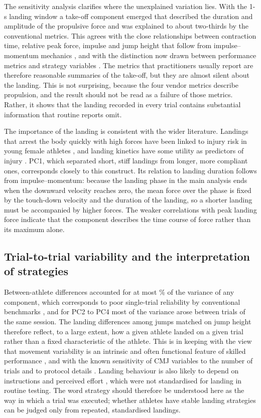 The sensitivity analysis clarifies where the unexplained variation lies. With the 1-s landing window a take-off component emerged that described the duration and amplitude of the propulsive force and was explained to about two-thirds by the conventional metrics. This agrees with the close relationships between contraction time, relative peak force, impulse and jump height that follow from impulse--momentum mechanics \citep{linthorne2001,mcmahon2018}, and with the distinction now drawn between performance metrics and strategy variables \citep{harry2024}. The metrics that practitioners usually report are therefore reasonable summaries of the take-off, but they are almost silent about the landing. This is not surprising, because the four vendor metrics describe propulsion, and the result should not be read as a failure of those metrics. Rather, it shows that the landing recorded in every trial contains substantial information that routine reports omit.

The importance of the landing is consistent with the wider literature. Landings that arrest the body quickly with high forces have been linked to injury risk in young female athletes \citep{leppanen2017}, and landing kinetics have some utility as predictors of injury \citep{pedley2020}. PC1, which separated short, stiff landings from longer, more compliant ones, corresponds closely to this construct. Its relation to landing duration follows from impulse--momentum: because the landing phase in the main analysis ends when the downward velocity reaches zero, the mean force over the phase is fixed by the touch-down velocity and the duration of the landing, so a shorter landing must be accompanied by higher forces. The weaker correlations with peak landing force indicate that the component describes the time course of force rather than its maximum alone.

\subsection{Trial-to-trial variability and the interpretation of strategies}

Between-athlete differences accounted for at most \betweenPCA\% of the variance of any component, which corresponds to poor single-trial reliability by conventional benchmarks \citep{koo2016}, and for PC2 to PC4 most of the variance arose between trials of the same session. The landing differences among jumps matched on jump height therefore reflect, to a large extent, how a given athlete landed on a given trial rather than a fixed characteristic of the athlete. This is in keeping with the view that movement variability is an intrinsic and often functional feature of skilled performance \citep{davids2003,bartlett2007,preatoni2013}, and with the known sensitivity of CMJ variables to the number of trials and to protocol details \citep{cormack2008,heishman2020}. Landing behaviour is also likely to depend on instructions and perceived effort \citep{hite2025}, which were not standardised for landing in routine testing. The word strategy should therefore be understood here as the way in which a trial was executed; whether athletes have stable landing strategies can be judged only from repeated, standardised landings.

